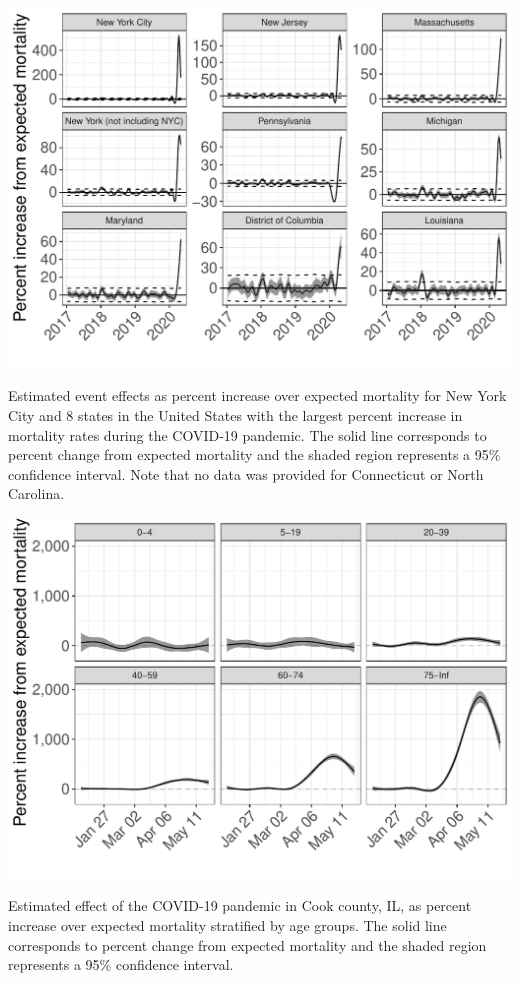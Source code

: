 \documentclass[11pt]{article}
\begin{document}
\begin{suppfigure}[ht]
	\centering
	\includegraphics[width=1\linewidth]{figs/supp-figure-4.pdf} 
	\caption{Estimated event effects as percent increase over expected mortality for New York City and 8 states in the United States with the largest percent increase in mortality rates during the COVID-19 pandemic. The solid line corresponds to percent change from expected mortality and the shaded region represents a 95\% confidence interval. Note that no data was provided for Connecticut or North Carolina.}
	\label{supp-fig:covid19-states}
\end{suppfigure}

\begin{suppfigure}[ht]
	\centering
	\includegraphics[width=1\linewidth]{figs/supp-figure-6.pdf} 
	\caption{Estimated effect of the COVID-19 pandemic in Cook county, IL, as percent increase over expected mortality stratified by age groups. The solid line corresponds to percent change from expected mortality and the shaded region represents a 95\% confidence interval.}
	\label{supp-fig:cook-agegroups}
\end{suppfigure}
\end{document}
